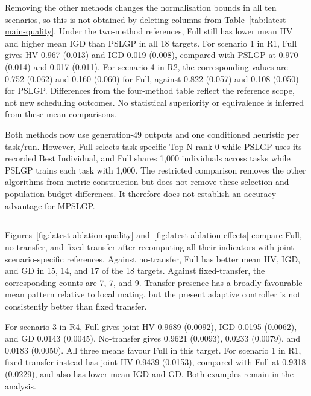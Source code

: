 Removing the other methods changes the normalisation bounds in all ten scenarios, so this is not obtained by deleting columns from Table~\ref{tab:latest-main-quality}. Under the two-method references, Full still has lower mean HV and higher mean IGD than PSLGP in all 18 targets. For scenario 1 in R1, Full gives HV 0.967 (0.013) and IGD 0.019 (0.008), compared with PSLGP at 0.970 (0.014) and 0.017 (0.011). For scenario 4 in R2, the corresponding values are 0.752 (0.062) and 0.160 (0.060) for Full, against 0.822 (0.057) and 0.108 (0.050) for PSLGP. Differences from the four-method table reflect the reference scope, not new scheduling outcomes. No statistical superiority or equivalence is inferred from these mean comparisons.

Both methods now use generation-49 outputs and one conditioned heuristic per task/run. However, Full selects task-specific Top-N rank 0 while PSLGP uses its recorded Best Individual, and Full shares 1,000 individuals across tasks while PSLGP trains each task with 1,000. The restricted comparison removes the other algorithms from metric construction but does not remove these selection and population-budget differences. It therefore does not establish an accuracy advantage for MPSLGP.



\subsection{}
Figures~\ref{fig:latest-ablation-quality} and~\ref{fig:latest-ablation-effects} compare Full, no-transfer, and fixed-transfer after recomputing all their indicators with joint scenario-specific references. Against no-transfer, Full has better mean HV, IGD, and GD in 15, 14, and 17 of the 18 targets. Against fixed-transfer, the corresponding counts are 7, 7, and 9. Transfer presence has a broadly favourable mean pattern relative to local mating, but the present adaptive controller is not consistently better than fixed transfer.

For scenario 3 in R4, Full gives joint HV 0.9689 (0.0092), IGD 0.0195 (0.0062), and GD 0.0143 (0.0045). No-transfer gives 0.9621 (0.0093), 0.0233 (0.0079), and 0.0183 (0.0050). All three means favour Full in this target. For scenario 1 in R1, fixed-transfer instead has joint HV 0.9439 (0.0153), compared with Full at 0.9318 (0.0229), and also has lower mean IGD and GD. Both examples remain in the analysis.

